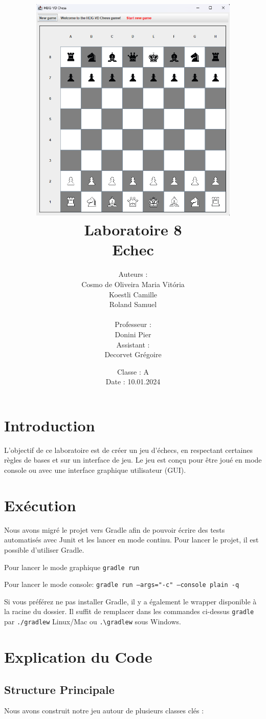 \documentclass[12pt]{article}
\title{
    \vspace{-2cm}
    \includegraphics[width=10cm]{chessgame.png} \\
    \Huge{Laboratoire 8} \\
    \Large{Echec}
}
\author{
    Auteurs : \\
    Cosmo de Oliveira Maria Vitória \\
    Koestli Camille \\
    Roland Samuel \\
    \\
    Professeur : \\
    Donini Pier \\
    Assistant : \\
    Decorvet Grégoire
}
\date{
    Classe : A \\
    Date : 10.01.2024
}
\begin{document}
    \maketitle

    \thispagestyle{empty} %
    \newpage

\maketitle

\section{Introduction}

L'objectif de ce laboratoire est de créer un jeu d'échecs, en respectant certaines règles de bases et sur un interface de jeu. Le jeu est conçu pour être joué en mode console ou avec une interface graphique utilisateur (GUI).

\section{Exécution}
	
Nous avons migré le projet vers Gradle afin de pouvoir écrire des tests automatisés avec Junit et les lancer en mode continu. Pour lancer le projet, il est possible d'utiliser Gradle.

Pour lancer le mode graphique \texttt{gradle run}

Pour lancer le mode console: \texttt{gradle run --args="-c" --console plain -q}

Si vous préférez ne pas installer Gradle, il y a également le wrapper disponible à la racine du dossier. Il suffit de remplacer dans les commandes ci-dessus \texttt{gradle} par \texttt{./gradlew} Linux/Mac ou \texttt{.\textbackslash gradlew} sous Windows.

\section{Explication du Code}

\subsection{Structure Principale}

Nous avons construit notre jeu autour de plusieurs classes clés :
\end{document}
